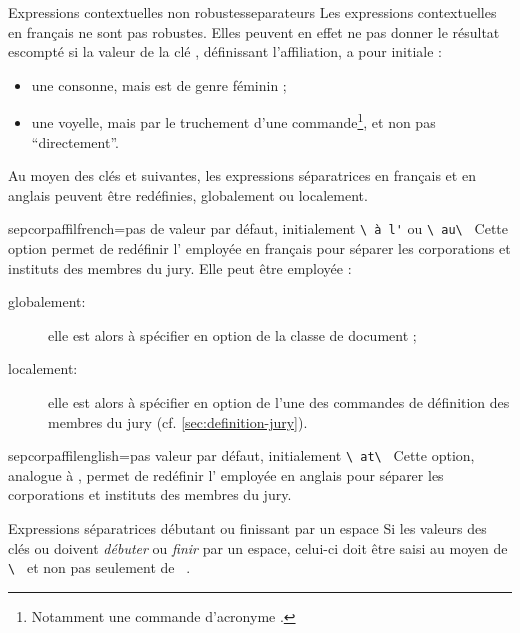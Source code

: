 \begin{dbwarning}{Expressions contextuelles non robustes}{separateurs}
  Les expressions contextuelles en français ne sont pas robustes. Elles peuvent
  en effet ne pas donner le résultat escompté si la valeur de la clé
  , définissant l'affiliation, a pour initiale :
  \begin{itemize}
  \item une consonne, mais est de genre féminin ;
  \item une voyelle, mais par le truchement d'une commande\footnote{Notamment
      une commande d'acronyme .}, et non pas \enquote{directement}.
  \end{itemize}
\end{dbwarning}

Au moyen des clés  et 
suivantes, les expressions séparatrices en français et en anglais peuvent être
redéfinies, globalement ou localement.

\begin{docKey}{sepcorpaffilfrench}{=}{pas de valeur par
    défaut, initialement \lstinline[showspaces]+\ à l'+ ou \lstinline[showspaces]+\ au\ +}
  Cette option permet de redéfinir l' employée en français
  pour séparer les corporations et instituts des membres du jury. Elle peut
  être employée :
  \begin{description}
  \item[globalement:] elle est alors à spécifier en option de la classe de
    document ;
  \item[localement:] elle est alors à spécifier en option de l'une des
    commandes de définition des membres du jury (cf.
    \vref{sec:definition-jury}).
  \end{description}
\end{docKey}

\begin{docKey}{sepcorpaffilenglish}{=}{pas valeur par
    défaut, initialement \lstinline[showspaces]+\ at\ +}
  Cette option, analogue à , permet de redéfinir
  l' employée en anglais pour séparer les corporations et
  instituts des membres du jury.
\end{docKey}

\begin{dbwarning}{Expressions séparatrices débutant ou finissant par un espace}{}
  Si les valeurs des clés  ou
   doivent \emph{débuter} ou \emph{finir} par un
  espace, celui-ci doit être saisi au moyen de
  \lstinline[showspaces]+\ +
  et non pas seulement de
  \lstinline[showspaces]+ +.
\end{dbwarning}

